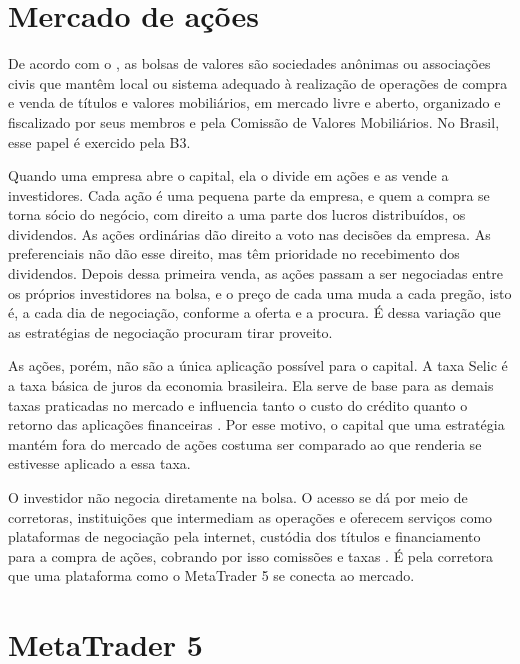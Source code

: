 \section{Mercado de ações}

De acordo com o , as bolsas de valores são sociedades
anônimas ou associações civis que mantêm local ou sistema adequado à realização de
operações de compra e venda de títulos e valores mobiliários, em mercado livre e
aberto, organizado e fiscalizado por seus membros e pela Comissão de Valores
Mobiliários. No Brasil, esse papel é exercido pela B3.

Quando uma empresa abre o capital, ela o divide em ações e as vende a
investidores. Cada ação é uma pequena parte da empresa, e quem a compra se torna
sócio do negócio, com direito a uma parte dos lucros distribuídos, os dividendos.
As ações ordinárias dão direito a voto nas decisões da empresa. As preferenciais
não dão esse direito, mas têm prioridade no recebimento dos dividendos. Depois
dessa primeira venda, as ações passam a ser negociadas entre os próprios
investidores na bolsa, e o preço de cada uma muda a cada pregão, isto é, a cada
dia de negociação, conforme a oferta e a procura. É dessa variação que as
estratégias de negociação procuram tirar proveito.

As ações, porém, não são a única aplicação possível para o capital. A taxa Selic é a taxa básica de juros da economia brasileira. Ela serve de base
para as demais taxas praticadas no mercado e influencia tanto o custo do crédito quanto o retorno das
aplicações financeiras \cite{bcbSelic}. Por esse motivo, o capital que uma
estratégia mantém fora do mercado de ações costuma ser comparado ao que renderia se
estivesse aplicado a essa taxa.

O investidor não negocia diretamente na bolsa. O acesso se dá por meio de
corretoras, instituições que intermediam as operações e oferecem serviços como
plataformas de negociação pela internet, custódia dos títulos e financiamento para
a compra de ações, cobrando por isso comissões e taxas \cite{bcbCorretoras}. É
pela corretora que uma plataforma como o MetaTrader 5 se conecta ao mercado.

\section{MetaTrader 5}


